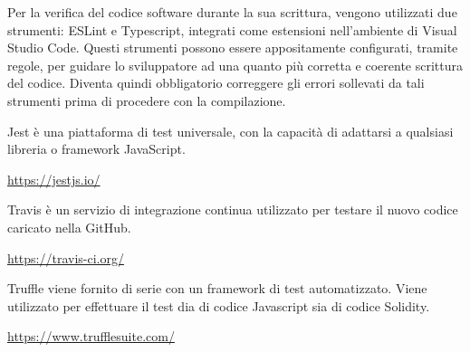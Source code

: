     	Per la verifica del codice software durante la sua scrittura, vengono utilizzati due strumenti: ESLint e Typescript, integrati come estensioni nell'ambiente di Visual Studio Code. Questi strumenti possono essere appositamente configurati, tramite regole, per guidare lo sviluppatore ad una quanto più corretta e coerente scrittura del codice. Diventa quindi obbligatorio correggere gli errori sollevati da tali strumenti prima di procedere con la compilazione.
    	
    	Jest è una piattaforma di test universale, con la capacità di adattarsi a qualsiasi libreria o framework JavaScript.
    	\begin{center}
    		\url{https://jestjs.io/}
    	\end{center}
    	
    	Travis è un servizio di integrazione continua utilizzato per testare il nuovo codice caricato nella GitHub.
    	\begin{center}
    		\url{https://travis-ci.org/}
    	\end{center}
    
    	Truffle viene fornito di serie con un framework di test automatizzato. Viene utilizzato per effettuare il test dia di codice Javascript sia di codice Solidity.
    	\begin{center}
    		\url{https://www.trufflesuite.com/}
    	\end{center}
	    
    	